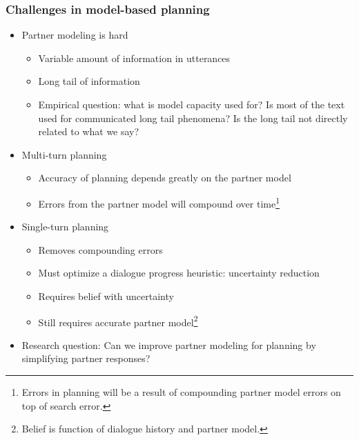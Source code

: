 \documentclass{beamer}
\begin{document}
\begin{frame}
\frametitle{Challenges in model-based planning}
\begin{itemize}
\item Partner modeling is hard
    \begin{itemize}
    \item Variable amount of information in utterances
    \item Long tail of information
    \item Empirical question: what is model capacity used for?
        Is most of the text used for communicated long tail phenomena?
        Is the long tail not directly related to what we say?
    \end{itemize}
\item Multi-turn planning
    \begin{itemize}
    \item Accuracy of planning depends greatly on the partner model
    \item Errors from the partner model will compound over time\footnote{
        Errors in planning will be a result of compounding partner model errors
            on top of search error.
    }
    \end{itemize}
\item Single-turn planning
    \begin{itemize}
    \item Removes compounding errors
    \item Must optimize a dialogue progress heuristic: uncertainty reduction
    \item Requires belief with uncertainty
    \item Still requires accurate partner model\footnote{
        Belief is function of dialogue history and partner model.
    }
    \end{itemize}
\item Research question: Can we improve partner modeling for planning
    by simplifying partner responses?
\end{itemize}
\end{frame}
\end{document}
